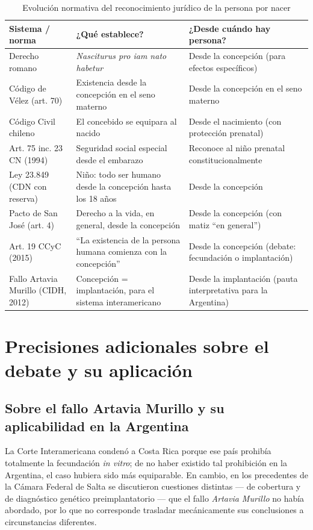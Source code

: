 \documentclass[12pt,oneside]{book}
\begin{document}
\begin{table}[H]
\centering
\small
\begin{tabularx}{\textwidth}{>{\raggedright\arraybackslash}p{} >{\raggedright\arraybackslash}X >{\raggedright\arraybackslash}p{}}
\toprule
\textbf{Sistema / norma} & \textbf{¿Qué establece?} & \textbf{¿Desde cuándo hay persona?} \\
\midrule
Derecho romano & \textit{Nasciturus pro iam nato habetur} & Desde la concepción (para efectos específicos) \\
Código de Vélez (art. 70) & Existencia desde la concepción en el seno materno & Desde la concepción en el seno materno \\
Código Civil chileno & El concebido se equipara al nacido & Desde el nacimiento (con protección prenatal) \\
Art. 75 inc. 23 CN (1994) & Seguridad social especial desde el embarazo & Reconoce al niño prenatal constitucionalmente \\
Ley 23.849 (CDN con reserva) & Niño: todo ser humano desde la concepción hasta los 18 años & Desde la concepción \\
Pacto de San José (art. 4) & Derecho a la vida, en general, desde la concepción & Desde la concepción (con matiz ``en general'') \\
Art. 19 CCyC (2015) & ``La existencia de la persona humana comienza con la concepción'' & Desde la concepción (debate: fecundación o implantación) \\
Fallo Artavia Murillo (CIDH, 2012) & Concepción = implantación, para el sistema interamericano & Desde la implantación (pauta interpretativa para la Argentina) \\
\bottomrule
\end{tabularx}
\caption{Evolución normativa del reconocimiento jurídico de la persona por nacer}
\end{table}

\section{Precisiones adicionales sobre el debate y su aplicación}

\subsection{Sobre el fallo Artavia Murillo y su aplicabilidad en la Argentina}

La Corte Interamericana condenó a Costa Rica porque ese país prohibía totalmente la fecundación \textit{in vitro}; de no haber existido tal prohibición en la Argentina, el caso hubiera sido más equiparable. En cambio, en los precedentes de la Cámara Federal de Salta se discutieron cuestiones distintas --- de cobertura y de diagnóstico genético preimplantatorio --- que el fallo \textit{Artavia Murillo} no había abordado, por lo que no corresponde trasladar mecánicamente sus conclusiones a circunstancias diferentes.
\end{document}
